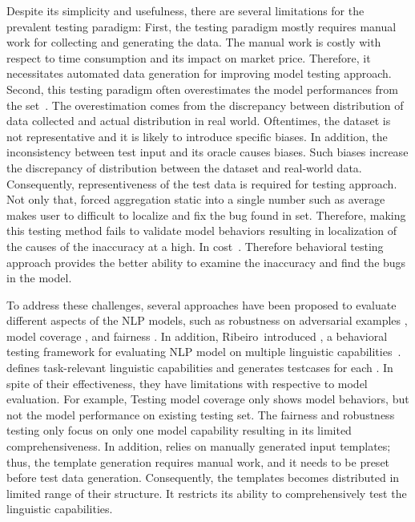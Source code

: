 Despite its simplicity and usefulness, there are several limitations
for the prevalent testing paradigm: First, the testing paradigm mostly
requires manual work for collecting and generating the data. The
manual work is costly with respect to time consumption and its impact
on market price. Therefore, it necessitates automated data generation
for improving model testing approach. Second, this testing paradigm
often overestimates the model performances from the \ho
set~\cite{patel2018mlevalforsoftware, recht2019imagenetbias,
  marcoACL2020checklist}.
The overestimation comes from the discrepancy between distribution of
data collected and actual distribution in real world.  Oftentimes, the
\ho dataset is not representative and it is likely to introduce
specific biases. In addition, the inconsistency between test input and
its oracle causes biases. Such biases increase the discrepancy of
distribution between the dataset and real-world data. Consequently,
representiveness of the test data is required for testing approach.
Not only that, forced aggregation static into a single number such as
average makes user to difficult to localize and fix the bug found in
\ho set. Therefore, making this testing method fails to validate model
behaviors resulting in localization of the causes of the inaccuracy at
a high. In cost~\cite{wu2019errudite}. Therefore behavioral testing
approach provides the better ability to examine the inaccuracy and
find the bugs in the model.

To address these challenges, several approaches have been proposed to
evaluate different aspects of the NLP models, such as robustness on
adversarial examples \cite{ribeiro2018sear,belinkov2018breaknmt,
  rychalska2019wildnlp,iyyer2018adversarial}, model coverage
\cite{rottger2020hatecheck}, and fairness
\cite{prabhakaran2019fairness,rottger2020hatecheck}. In addition,
Ribeiro~\etal introduced \Cklst, a behavioral testing framework for
evaluating NLP model on multiple linguistic
capabilities~\cite{marcoACL2020checklist}. \Cklst defines
task-relevant linguistic capabilities and generates testcases for each
\lc. In spite of their effectiveness, they have limitations with
respective to model evaluation. For example, Testing model coverage
only shows model behaviors, but not the model performance on existing
testing set. The fairness and robustness testing only focus on only
one model capability resulting in its limited comprehensiveness. In
addition, \Cklst relies on manually generated input templates; thus,
the template generation requires manual work, and it needs to be
preset before test data generation. Consequently, the templates
becomes distributed in limited range of their structure. It restricts
its ability to comprehensively test the linguistic capabilities.

